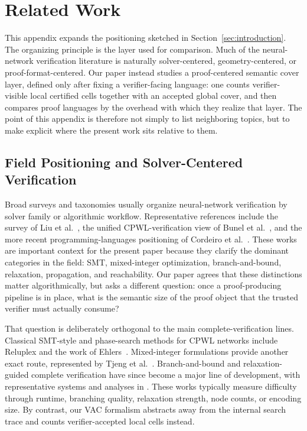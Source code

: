 \section{Related Work}
\label{app:related-work}

This appendix expands the positioning sketched in Section~\ref{sec:introduction}. The organizing principle is the layer used for comparison. Much of the neural-network verification literature is naturally solver-centered, geometry-centered, or proof-format-centered. Our paper instead studies a proof-centered semantic cover layer, defined only after fixing a verifier-facing language: one counts verifier-visible local certified cells together with an accepted global cover, and then compares proof languages by the overhead with which they realize that layer. The point of this appendix is therefore not simply to list neighboring topics, but to make explicit where the present work sits relative to them.

\subsection{Field Positioning and Solver-Centered Verification}

Broad surveys and taxonomies usually organize neural-network verification by solver family or algorithmic workflow. Representative references include the survey of Liu et al.~\cite{Liu2021Survey}, the unified CPWL-verification view of Bunel et al.~\cite{Bunel2018UnifiedView}, and the more recent programming-languages positioning of Cordeiro et al.~\cite{Cordeiro2025PLChallenge}. These works are important context for the present paper because they clarify the dominant categories in the field: SMT, mixed-integer optimization, branch-and-bound, relaxation, propagation, and reachability. Our paper agrees that these distinctions matter algorithmically, but asks a different question: once a proof-producing pipeline is in place, what is the semantic size of the proof object that the trusted verifier must actually consume?

That question is deliberately orthogonal to the main complete-verification lines. Classical SMT-style and phase-search methods for CPWL networks include Reluplex and the work of Ehlers~\cite{Katz2017Reluplex,Ehlers2017PiecewiseLinear}. Mixed-integer formulations provide another exact route, represented by Tjeng et al.~\cite{Tjeng2019MIP}. Branch-and-bound and relaxation-guided complete verification have since become a major line of development, with representative systems and analyses in \cite{Bunel2020BranchBound,Xu2021FastComplete,Ferrari2022MultiNeuronBaB,Wang2021BetaCROWN,Zhang2022GCPCROWN,Shi2025GenBaB,Chiu2025SDPCROWN}. These works typically measure difficulty through runtime, branching quality, relaxation strength, node counts, or encoding size. By contrast, our VAC formalism abstracts away from the internal search trace and counts verifier-accepted local cells instead.

